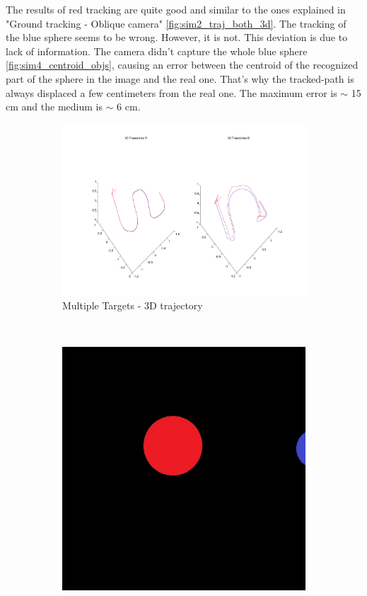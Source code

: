 	The results of red tracking are quite good and similar to the ones explained in "Ground tracking - Oblique camera" \ref{fig:sim2_traj_both_3d}. The tracking of the blue sphere seems to be wrong. However, it is not. This deviation is due to lack of information. The camera didn't capture the whole blue sphere \ref{fig:sim4_centroid_objs}, causing an error between the centroid of the recognized part of the sphere in the image and the real one. That's why the tracked-path is always displaced a few centimeters from the real one. The maximum error is $\sim$ 15 cm and the medium is $\sim$ 6 cm.



\begin{figure}[t]
	\centering
	\begin{subfigure}{0.6\linewidth}
		\centering
		\includegraphics[width=\linewidth]{../Images/c3/sim4_3dtraj}
		\caption{Multiple Targets - 3D trajectory}
		\label{fig:sim4_3dtraj}
	\end{subfigure}
	~
	\begin{subfigure}{0.2\linewidth}
		\centering
		\includegraphics[width=\linewidth]{../Images/c3/sims_two_object_centroid_out}

\end{subfigure}
\end{figure}
